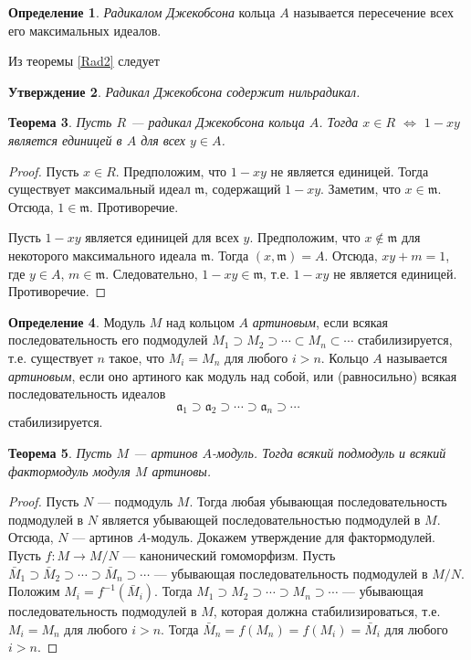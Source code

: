 \documentclass[12pt, titlepage, oneside]{amsbook}
\newcommand{\aaa}{\mathfrak{a}}
\newcommand{\mmm}{\mathfrak{m}}
\newtheorem{theorem}{Теорема}[chapter]
\newtheorem{claim}[theorem]{Утверждение}
\theoremstyle{definition}
\newtheorem{definition}[theorem]{Определение}
\theoremstyle{remark}
\begin{document}
\begin{definition}
	\emph{Радикалом Джекобсона} кольца $A$ называется пересечение всех его максимальных идеалов.
\end{definition}

Из теоремы \ref{Rad2} следует

\begin{claim}
	\label{Rad3}
	Радикал Джекобсона содержит нильрадикал.
\end{claim}

\begin{theorem}
	\label{Rad4}
	Пусть $R$ --- радикал Джекобсона кольца $A$. Тогда $x\in R$ $\Leftrightarrow$ $1-xy$ является единицей в $A$ для всех $y\in A$.
\end{theorem}

\begin{proof}
	Пусть $x\in R$. Предположим, что $1-xy$ не является единицей. Тогда существует максимальный идеал $\mmm$, содержащий $1-xy$. Заметим, что $x\in\mmm$. Отсюда, $1\in\mmm$. Противоречие.
	
	Пусть $1-xy$ является единицей для всех $y$. Предположим, что $x\not\in\mmm$ для некоторого максимального идеала $\mmm$. Тогда $(x,\mmm)=A$. Отсюда, $xy+m=1$, где $y\in A$, $m\in\mmm$. Следовательно, $1-xy\in\mmm$, т.е. $1-xy$ не является единицей. Противоречие.
\end{proof}

\begin{definition}
	Модуль $M$ над кольцом $A$ \emph{артиновым}, если всякая последовательность его подмодулей $M_1\supset M_2\supset\cdots\subset M_n\subset\cdots$ стабилизируется, т.е. существует $n$ такое, что $M_i=M_n$ для любого $i>n$. Кольцо $A$ называется \emph{артиновым}, если оно артиного как модуль над собой, или (равносильно) всякая последовательность идеалов $$\aaa_1\supset\aaa_2\supset\cdots\supset\aaa_n\supset\cdots$$ стабилизируется.
\end{definition}

\begin{theorem}
	\label{ArtM1}
	Пусть $M$ --- артинов $A$-модуль. Тогда всякий подмодуль и всякий фактормодуль модуля $M$ артиновы.
\end{theorem}

\begin{proof}
	Пусть $N$ --- подмодуль $M$. Тогда любая убывающая последовательность подмодулей в $N$ является убывающей последовательностью подмодулей в $M$. Отсюда, $N$ --- артинов $A$-модуль. Докажем утверждение для фактормодулей.
	Пусть $f\colon M\rightarrow M/N$ --- канонический гомоморфизм. Пусть $\bar{M}_1\supset \bar{M}_2\supset \cdots\supset  \bar{M}_n\supset \cdots$ --- убывающая последовательность подмодулей в $M/N$. Положим $M_i=f^{-1}(\bar{M}_i)$. Тогда $M_1\supset M_2\supset\cdots\supset M_n\supset\cdots$ --- убывающая последовательность подмодулей в $M$, которая должна стабилизироваться, т.е. $M_i=M_n$ для любого $i>n$. Тогда $\bar{M}_n=f(M_n)=f(M_i)=\bar{M}_i$ для любого $i>n$.
\end{proof}
\end{document}
